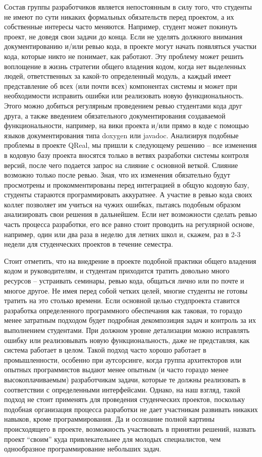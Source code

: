 \documentclass[a5paper]{article}
\begin{document}
Состав группы разработчиков является непостоянным в силу того, что студенты не имеют по сути никаких формальных обязательств перед проектом, а их собственные интересы часто меняются. Например, студент может покинуть проект, не доведя свои задачи до конца. Если не уделять должного внимания документированию и/или ревью кода, в проекте могут начать появляться участки кода, которые никто не понимает, как работают. Эту проблему может решить воплощение в жизнь стратегии общего владения кодом, когда нет выделенных людей, ответственных за какой-то определенный модуль, а каждый имеет представление об всех (или почти всех) компонентах системы и может при необходимости исправить ошибки или реализовать новую функциональность. Этого можно добиться регулярным проведением ревью студентами кода друг друга, а также введением обязательного документирования создаваемой функциональности, например, на вики проекта и/или прямо в коде с помощью языков документирования типа doxygen или javadoc. Анализируя подобные проблемы в проекте QReal, мы пришли к следующему решению -- все изменения в кодовую базу проекта вносятся только в ветвях разработки системы контроля версий, после чего подается запрос на слияние с основной веткой. Слияние возможно только после ревью. Зная, что их изменения обязательно будут просмотрены и прокомментированы перед интеграцией в общую кодовую базу, студенты стараются программировать аккуратнее. А участие в ревью кода своих коллег позволяет им учиться на чужих ошибках, пытаясь подобным образом анализировать свои решения в дальнейшем. Если нет возможности сделать ревью часть процесса разработки, его все равно стоит проводить на регулярной основе, например, один или два раза в неделю для летних школ и, скажем, раз в 2-3 недели для студенческих проектов в течение семестра.

Стоит отметить, что на внедрение в проекте подобной практики общего владения кодом и руководителям, и студентам приходится тратить довольно много ресурсов -- устраивать семинары, ревью кода, общаться лично или по почте и многое другое. Не имея перед собой четких целей, многие студенты не готовы тратить на это столько времени. Если основной целью студпроекта ставится разработка определенного программного обеспечания как таковая, то гораздо менее затратным подходом будет подробная декомпозиция задач и контроль за их выполнением студентами. При должном уровне детализации можно исправлять ошибку или реализовывать новую функциональность, даже не представляя, как система работает в целом. Такой подход часто хорошо работает в промышленности, особенно при аутсорсинге, когда группа архитекторов или опытных программистов выдают менее опытным (и часто гораздо менее высокоплачиваемым) разработчикам задачи, которые те должны реализовать в соответствии с определенными интерфейсами. Однако, на наш взгляд, такой подход не стоит применять для проведения студенческих проектов, поскольку подобная организация процесса разработки не дает участникам развивать никаких навыков, кроме программирования. Да и осознание полной картины происходящего в проекте, возможность участвовать в принятии решений, назвать проект ``своим'' куда привлекательнее для молодых специалистов, чем однообразное программирование небольших задач. 
\end{document}
